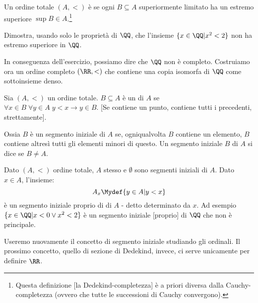 \documentclass[11pt]{scrartcl}
\begin{document}
\begin{definition}
	Un ordine totale $(A,<)$ è  se ogni $B \subseteq A$ superiormente limitato ha un estremo superiore $\sup B \in A$.\footnote{Questa definizione [la Dedekind-completezza] è a priori diversa dalla Cauchy-completezza (ovvero che tutte le successioni di Cauchy convergono).}
\end{definition}

\begin{exercise}
	\label{q_noncompleto}
	Dimostra, usando solo le proprietà di $\QQ$, che l'insieme $\{x \in \QQ | x^2 < 2\}$ non ha estremo superiore in $\QQ$.
\end{exercise}

\begin{soln}
	
\end{soln}

In conseguenza dell'esercizio, possiamo dire che $\QQ$ non è completo. Costruiamo ora un ordine completo $(\RR,<)$ che contiene una copia isomorfa di $\QQ$ come sottoinsieme denso.

\begin{definition}
	Sia $(A,<)$ un ordine totale. $B \subseteq A$ è un  di $A$ se $\forall x \in B \; \forall y \in A \; y < x \rightarrow y \in B$. [Se contiene un punto, contiene tutti i precedenti, strettamente].
\end{definition}

Ossia $B$ è un segmento iniziale di $A$ se, ogniqualvolta $B$ contiene un elemento, $B$ contiene altresì tutti gli elementi minori di questo.
Un segmento iniziale $B$ di $A$ si dice  se $B \ne A$.

\begin{example}
	Dato $(A,<)$ ordine totale, $A$ stesso e $\emptyset$ sono segmenti iniziali di $A$. Dato $x \in A$, l'insieme:
	\[ A_x \Mydef \{y \in A | y < x\}
		\]
	è un segmento iniziale proprio di di $A$ - detto  determinato da $x$. Ad esempio $\{x \in \QQ | x < 0 \lor x^2 < 2\}$
	è un segmento iniziale [proprio] di $\QQ$ che non è principale.
\end{example}

\begin{note}
	Useremo nuovamente il concetto di segmento iniziale studiando gli ordinali. Il prossimo concetto, quello di sezione di Dedekind, invece, ci serve unicamente per definire $\RR$.
\end{note}
\end{document}
